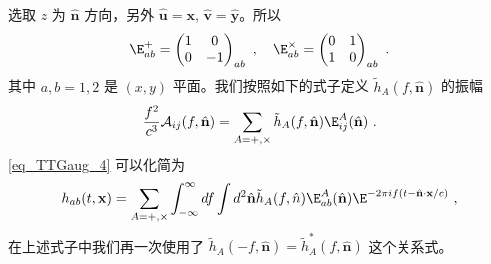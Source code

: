 选取 $z$ 为 $\hat{ \mathbf n }$ 方向，另外 $\hat{ \mathbf u }=\mathbf x$, $\hat{ \mathbf v } = \hat{ \mathbf y }$。所以
\begin{equation}
\E^+_{ab} = \begin{pmatrix}
1 & 0 \\
0 & -1 
\end{pmatrix}_{ab}~, \quad \E^\times_{ab} = \begin{pmatrix}
0 & 1 \\
1 & 0 
\end{pmatrix}_{ab}~.
\end{equation}
其中 $a,b = 1,2$ 是 $(x,y)$ 平面。我们按照如下的式子定义 $\tilde h_A(f,\hat{ {\mathbf n} })$ 的振幅
\begin{equation}
\frac{f^2}{c^3} \mathcal A_{ij} (f,\hat{ \mathbf n }) = \sum_{A = +,\times} \tilde h_{A} (f, \hat{  {\mathbf n} } ) \E^A_{ij} (\hat{ {\mathbf n} } )~.
\end{equation}
\autoref{eq_TTGaug_4} 可以化简为
\begin{equation}
h_{ab}(t,\mathbf x) = \sum_{A = +,\times} \int_{-\infty}^{\infty} df \int d^2 \hat{\mathbf n } \tilde h_A (f, \hat{ n }  ) \E^A_{ab} ( \hat{ \mathbf n } ) \E^{-2 \pi i f (t - \hat{ \mathbf n }\cdot {\mathbf x}/c )}~,
\end{equation}
在上述式子中我们再一次使用了 $\tilde h_A (-f, \hat{ \mathbf n } ) = \tilde h_A^* (f, \hat{ \mathbf n }) $ 这个关系式。






 


 

















